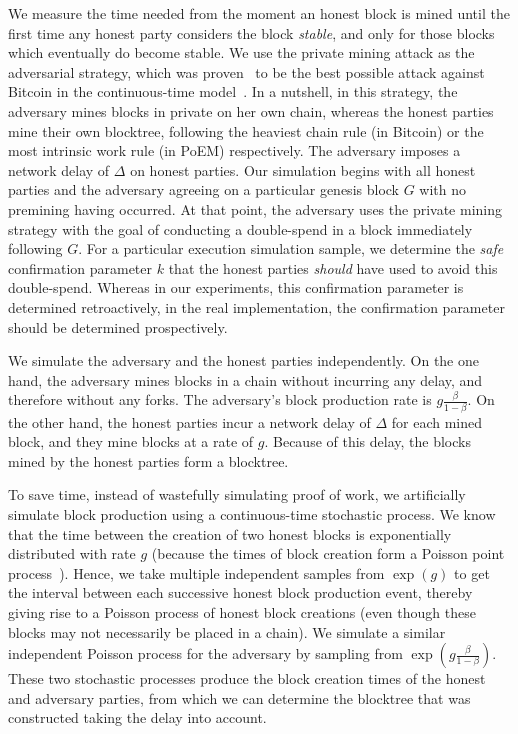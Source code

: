 We measure the time needed from the moment an honest block is mined until
the first time any honest party considers the block \emph{stable}, and only for those blocks
which eventually do become stable.
We use the private mining attack as the adversarial strategy, which was
proven~\cite{eiar} to be the best possible attack against Bitcoin in the continuous-time model~\cite{bitcoin-made-simple}.
In a nutshell, in this strategy, the adversary mines blocks in private on her own chain, whereas the honest parties mine
their own blocktree, following the heaviest chain rule (in Bitcoin) or the most intrinsic work rule (in PoEM) respectively.
The adversary imposes a network delay of $\Delta$ on honest parties.
Our simulation begins with all honest parties and the adversary agreeing on a particular genesis block
$G$ with no premining having occurred. At that point, the adversary uses the private mining strategy
with the goal of conducting a double-spend in a block immediately following $G$.
For a particular execution simulation sample, we determine the \emph{safe} confirmation parameter $k$
that the honest parties \emph{should} have used to avoid this double-spend.
Whereas in our experiments, this confirmation parameter is determined retroactively,
in the real implementation, the confirmation parameter should be determined prospectively.

We simulate the adversary and the honest parties independently. On the one hand, the adversary mines blocks
in a chain without incurring any delay, and therefore without any forks. The adversary's block production rate is
$g\frac{\beta}{1 - \beta}$. On the other hand, the honest parties incur a network delay of $\Delta$ for each mined block,
and they mine blocks at a rate of $g$. Because of this delay, the blocks mined by the honest parties form a blocktree.

To save time, instead of wastefully simulating proof of work, we artificially simulate block production using a
continuous-time stochastic process.
We know that the time between the creation of two honest blocks is exponentially distributed
with rate $g$ (because the times of block creation form a Poisson point process~\cite{bitcoin-made-simple}).
Hence, we take multiple independent samples from $\exp(g)$ to get the interval between each successive honest block production event,
thereby giving rise to a Poisson process of honest block creations (even though these blocks may not necessarily be placed in a chain).
We simulate a similar independent Poisson process for the adversary
by sampling from $\exp(g\frac{\beta}{1 - \beta})$. These two stochastic processes produce the block creation times of the honest and
adversary parties, from which we can determine the blocktree that was constructed taking the delay into account.

